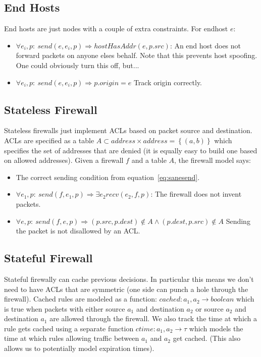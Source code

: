 \subsection{End Hosts}
End hosts are just nodes with a couple of extra constraints. For endhost $e$:
\begin{itemize}
\item $\forall e_i, p:\ send(e, e_i, p) \Rightarrow hostHasAddr(e, p.src)$: An end host does not forward packets on anyone
elses behalf. Note that this prevents host spoofing. One could obviously turn this off, but...
\item $\forall e_i, p:\ send(e, e_i, p) \Rightarrow p.origin = e$ Track origin correctly.
\end{itemize}

\subsection{Stateless Firewall}
Stateless firewalls just implement ACLs based on packet source and destination. ACLs are specified as a table $A \subset
address\times address = \left\{(a, b)\right\}$ which specifies the set of addresses that are denied (it is equally easy
to build one based on allowed addresses). Given a firewall $f$ and a table $A$, the firewall model says:

\begin{itemize}
\item The correct sending condition from equation~\ref{eq:sanesend}.
\item $\forall e_1, p:\ send(f, e_1, p) \Rightarrow \exists e_2 recv(e_2, f, p)$: The firewall does not invent packets.
\item $\forall e, p:\ send(f, e, p) \Rightarrow (p.src, p.dest) \not \in A \land (p.dest, p.src) \not \in A$ Sending the packet is not disallowed by an
ACL.
\end{itemize}

\subsection{Stateful Firewall}
Stateful firewally can cache previous decisions. In particular this means we don't need to have ACLs that are symmetric
(one side can punch a hole through the firewall). Cached rules are modeled as a function: $cached: a_1, a_2 \rightarrow
boolean$ which is true when packets with either source $a_1$ and destination $a_2$ or source $a_2$ and destination $a_1$
are allowed through the firewall. We also track the time at which a rule gets cached using a separate function $ctime:
a_1, a_2 \rightarrow \tau$ which models the time at which rules allowing traffic between $a_1$ and $a_2$ get cached.
(This also allows us to potentially model expiration times).

